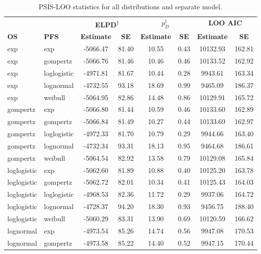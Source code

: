 \documentclass[AMA,STIX1COL]{WileyNJD-v2}
\begin{document}
\begin{table}[H]
\caption{PSIS-LOO statistics for all distributions and separate model. \label{tab:loo_separate}}
\centering
\begin{tabular}{l l c c c c c c}
\toprule
\multicolumn{1}{l}{} & \multicolumn{1}{l}{} & \multicolumn{2}{c}{\textbf{ELPD\textsuperscript{$\dagger$}}} & \multicolumn{2}{c}{\textbf{$p_D^{\ddagger}$}} & \multicolumn{2}{c}{\textbf{LOO AIC}} \\
\cmidrule{3-4}\cmidrule{5-6}\cmidrule{7-8}
\textbf{OS} & \textbf{PFS} & \textbf{Estimate} & \textbf{SE} & \textbf{Estimate} & \textbf{SE} & \textbf{Estimate} & \textbf{SE}\\
\midrule
exp & exp & -5066.47 & 81.40 & 10.55 & 0.43 & 10132.93 & 162.81\\
exp & gompertz & -5066.76 & 81.46 & 10.46 & 0.46 & 10133.52 & 162.92\\
exp & loglogistic & -4971.81 & 81.67 & 10.44 & 0.28 & 9943.61 & 163.34\\
exp & lognormal & -4732.55 & 93.18 & 18.69 & 0.99 & 9465.09 & 186.37\\
exp & weibull & -5064.95 & 82.86 & 14.48 & 0.86 & 10129.91 & 165.72\\
gompertz & exp & -5066.80 & 81.44 & 10.59 & 0.46 & 10133.60 & 162.89\\
gompertz & gompertz & -5066.84 & 81.49 & 10.27 & 0.44 & 10133.69 & 162.97\\
gompertz & loglogistic & -4972.33 & 81.70 & 10.79 & 0.29 & 9944.66 & 163.40\\
gompertz & lognormal & -4732.34 & 93.31 & 18.13 & 0.95 & 9464.68 & 186.61\\
gompertz & weibull & -5064.54 & 82.92 & 13.58 & 0.79 & 10129.08 & 165.84\\
loglogistic & exp & -5062.60 & 81.89 & 10.88 & 0.40 & 10125.20 & 163.78\\
loglogistic & gompertz & -5062.72 & 82.01 & 10.34 & 0.41 & 10125.43 & 164.03\\
loglogistic & loglogistic & -4968.53 & 82.36 & 11.72 & 0.29 & 9937.06 & 164.72\\
loglogistic & lognormal & -4728.37 & 94.20 & 18.30 & 0.93 & 9456.75 & 188.40\\
loglogistic & weibull & -5060.29 & 83.31 & 13.90 & 0.69 & 10120.59 & 166.62\\
lognormal & exp & -4973.54 & 85.26 & 14.74 & 0.56 & 9947.08 & 170.53\\
lognormal & gompertz & -4973.58 & 85.22 & 14.40 & 0.52 & 9947.15 & 170.44\\

\end{tabular}
\end{table}
\end{document}
